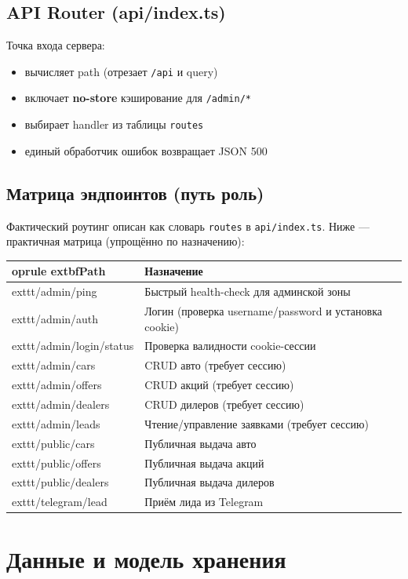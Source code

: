 \documentclass[12pt,a4paper]{article}
\begin{document}
\subsection{API Router (api/index.ts)}
Точка входа сервера:
\begin{itemize}[leftmargin=18pt]
  \item вычисляет path (отрезает \texttt{/api} и query)
  \item включает \textbf{no-store} кэширование для \texttt{/admin/*}
  \item выбирает handler из таблицы \texttt{routes}
  \item единый обработчик ошибок возвращает JSON 500
\end{itemize}

\subsection{Матрица эндпоинтов (путь \textrightarrow роль)}
Фактический роутинг описан как словарь \texttt{routes} в \texttt{api/index.ts}. Ниже --- практичная матрица (упрощённо по назначению):

\begin{longtable}{@{}p{}p{}@{}}
	oprule
	extbf{Path} & \textbf{Назначение} \\
\midrule
	exttt{/admin/ping} & Быстрый health-check для админской зоны \\
	exttt{/admin/auth} & Логин (проверка username/password и установка cookie) \\
	exttt{/admin/login/status} & Проверка валидности cookie-сессии \\
	exttt{/admin/cars} & CRUD авто (требует сессию) \\
	exttt{/admin/offers} & CRUD акций (требует сессию) \\
	exttt{/admin/dealers} & CRUD дилеров (требует сессию) \\
	exttt{/admin/leads} & Чтение/управление заявками (требует сессию) \\
	exttt{/public/cars} & Публичная выдача авто \\
	exttt{/public/offers} & Публичная выдача акций \\
	exttt{/public/dealers} & Публичная выдача дилеров \\
	exttt{/telegram/lead} & Приём лида из Telegram \\
\bottomrule
\end{longtable}

\section{Данные и модель хранения}
\end{document}
